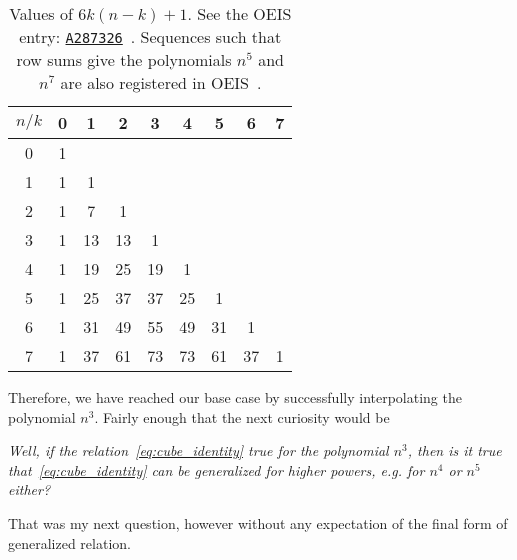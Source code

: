 \begin{table}[H]
    \setlength\extrarowheight{-6pt}
    \begin{tabular}{c|cccccccc}
        $n/k$ & 0 & 1  & 2  & 3  & 4  & 5  & 6  & 7 \\
        \hline
        0     & 1 &    &    &    &    &    &    &   \\
        1     & 1 & 1  &    &    &    &    &    &   \\
        2     & 1 & 7  & 1  &    &    &    &    &   \\
        3     & 1 & 13 & 13 & 1  &    &    &    &   \\
        4     & 1 & 19 & 25 & 19 & 1  &    &    &   \\
        5     & 1 & 25 & 37 & 37 & 25 & 1  &    &   \\
        6     & 1 & 31 & 49 & 55 & 49 & 31 & 1  &   \\
        7     & 1 & 37 & 61 & 73 & 73 & 61 & 37 & 1
    \end{tabular}
    \caption{Values of $6k(n-k) + 1$.
    See the OEIS entry: \href{https://oeis.org/A287326}{\texttt{A287326}}~\cite{kolosov2017third}.
    Sequences such that row sums give the polynomials $n^{5}$ and $n^7$
        are also registered in OEIS~\cite{kolosov2018fifth, kolosov2018seventh}.}
    \label{tab:fig_1}
\end{table}
Therefore, we have reached our base case by successfully interpolating the polynomial $n^3$.
Fairly enough that the next curiosity would be
\begin{center}
    \textit{Well, if the relation~\eqref{eq:cube_identity} true for the polynomial $n^3$,
        then is it true that~\eqref{eq:cube_identity} can be generalized for higher powers, e.g. for $n^4$ or $n^5$ either?}
\end{center}
That was my next question, however without any expectation of the final form of generalized relation.




